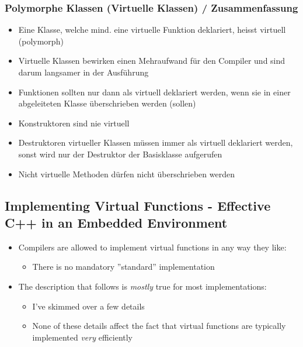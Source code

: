 \subsubsection{Polymorphe Klassen (Virtuelle Klassen) / Zusammenfassung}
\begin{itemize}
  \item Eine Klasse, welche mind. eine virtuelle Funktion deklariert, heisst virtuell (polymorph)
  \item Virtuelle Klassen bewirken einen Mehraufwand für den Compiler und sind darum langsamer in der Ausführung
  \item Funktionen sollten nur dann als virtuell deklariert werden, wenn sie in einer abgeleiteten Klasse überschrieben werden (sollen)
  \item Konstruktoren sind nie virtuell
  \item Destruktoren virtueller Klassen müssen immer als virtuell deklariert werden, sonst wird nur der Destruktor der Basisklasse aufgerufen
  \item Nicht virtuelle Methoden dürfen nicht überschrieben werden
\end{itemize}

\subsection{Implementing Virtual Functions - Effective C++ in an Embedded Environment}
\begin{itemize}
  \item Compilers are allowed to implement virtual functions in any way they like:
  \begin{itemize}
    \item There is no mandatory ''standard'' implementation
  \end{itemize}
  \item The description that follows is \textit{mostly} true for most implementations:
  \begin{itemize}
    \item I've skimmed over a few details
    \item None of these details affect the fact that virtual functions are typically implemented \textit{very} efficiently
  \end{itemize}
\end{itemize}

